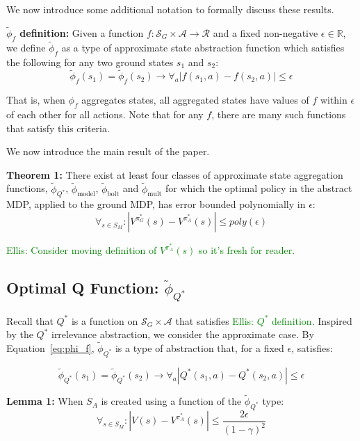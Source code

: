 \documentclass{article}
\newcommand{\ep}{\widetilde \phi}
\newcommand\enote[1]{\textcolor{green}{Ellis: #1}}
\begin{document}
We now introduce some additional notation to formally discuss these results.

{\bf $\ep_f$ definition:} Given a function $f : \mathcal{S}_G \times \mathcal{A} \rightarrow \mathcal{R}$ and a fixed non-negative $\epsilon \in \mathbb{R}$, we define $\ep_f$ as a type of approximate state abstraction function which satisfies the following for any two ground states $s_1$ and $s_2$: 
\begin{equation}
\label{eq:phi_f}
\ep_f(s_1) = \ep_f(s_2) \rightarrow \forall_a \left|f(s_1, a) - f(s_2, a)\right| \leq \epsilon
\end{equation}

That is, when $\phi_f$ aggregates states, all aggregated states have values of $f$ within $\epsilon$ of each other for all actions. Note that for any $f$, there are many such functions that satisfy this criteria.

We now introduce the main result of the paper.

{\bf Theorem 1:} There exist at least four classes of approximate state aggregation functions, $\ep_{Q^*}$, $\ep_{\text{model}}$, $\ep_{\text{bolt}}$ and $\ep_{\text{mult}}$ for which the optimal policy in the abstract MDP, applied to the ground MDP, has error bounded polynomially in $\epsilon$:
\begin{equation}
\forall_{s \in S_M} : | V^{\pi^*_G}(s) - V^{\pi^*_{A}}(s) | \leq poly(\epsilon)
\end{equation}

\enote{Consider moving definition of $V^{\pi^*_{A}}(s)$ so it's fresh for reader.}

\subsection{Optimal Q Function: $\ep_{Q^*}$}

Recall that $Q^*$ is a function on $\mathcal{S}_G \times \mathcal{A}$ that satisfies \enote{$Q^*$ definition}. Inspired by the $Q^*$ irrelevance abstraction, we consider the approximate case. By Equation~\ref{eq:phi_f}, $\ep_{Q^*}$ is a type of abstraction that, for a fixed $\epsilon$, satisfies:

\begin{equation}
\ep_{Q^*}(s_1) = \ep_{Q^*}(s_2) \rightarrow \forall_a \left|Q^*(s_1, a) - Q^*(s_2, a)\right| \leq \epsilon
\end{equation}

{\bf Lemma 1:} When $S_A$ is created using a function of the $\ep_{Q^*}$ type:
\begin{equation}
\forall_{s \in S_M} : | V(s) - V^{\pi^*_{A}}(s) | \leq \frac{2\epsilon}{(1-\gamma)^2}
\end{equation}
\end{document}
